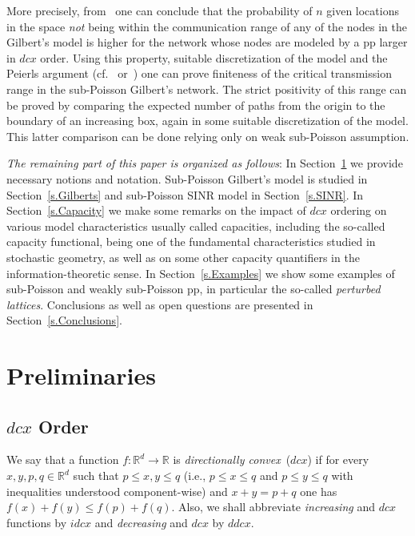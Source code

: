 \documentclass[conference]{IEEEtran}
\begin{document}
More precisely, from~\cite[Propsition~4.1]{snorder}
one can conclude  that the probability of $n$ given locations 
in the space {\em not} being within the communication
range of any of the nodes in the Gilbert's model 
is higher for the network whose nodes are modeled by a pp
larger in $dcx$ order. Using this property, suitable discretization of the model
and the Peierls argument 
(cf.~\cite[ pp.~17--18]{Gr99} or~\cite[Proposition 14.1.4]{FnT1}) 
one can prove finiteness of the critical transmission range in the
sub-Poisson Gilbert's network. The strict positivity of this range 
can be proved by comparing the expected number of paths from the origin
to the boundary of an increasing box, again  in some suitable
discretization of the model. This latter comparison can be done relying only on weak
sub-Poisson assumption. 

{\em The remaining part of this paper is organized as follows}: In
Section~\ref{s.Preliminaries} we provide necessary notions and
notation. 
Sub-Poisson Gilbert's model  is studied in Section~\ref{s.Gilberts}
and sub-Poisson SINR model in Section~\ref{s.SINR}. 
In Section~\ref{s.Capacity} we make some remarks on 
the impact of $dcx$ ordering on various model characteristics usually called 
capacities, including  the so-called capacity functional, being one of the
fundamental characteristics studied in stochastic geometry, as well as
on some other capacity quantifiers in the information-theoretic sense.
In Section~\ref{s.Examples} we show some examples of sub-Poisson and
weakly sub-Poisson pp, in particular the so-called {\em perturbed
lattices}.  Conclusions as well
as open questions are presented in Section~\ref{s.Conclusions}.  

\section{Preliminaries}
\label{s.Preliminaries}

\subsection{$dcx$ Order}
\label{sec:dcx_defns}
We say that a function $f:{{\mathbb{R}}}^d \to {{\mathbb{R}}}$ is
{\em directionally convex}~($dcx$) if for every $x,y,p,q \in {{\mathbb{R}}}^d$ such that
$p \leq x,y \leq q$ (i.e., $p \leq x \leq q$ and $p \leq y \leq q$ with inequalities understood component-wise)
and $x+y = p+q$ one has  $f(x) + f(y) \leq f(p) + f(q)$. 
Also, we shall abbreviate {\em increasing} and $dcx$ functions by $idcx$ and
{\em decreasing} and $dcx$ by $ddcx$. 
\end{document}
